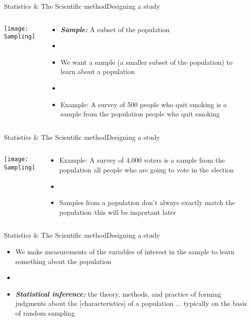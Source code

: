 \documentclass[xcolor=dvipsnames]{beamer}
\begin{document}
\begin{frame}{Statistics \& The Scientific method}{Designing a study}
	\begin{columns}
		\begin{column}{0.5 \textwidth}
			\texttt{[image: Sampling]}
		\end{column}
		\begin{column}{0.5 \textwidth}
			\begin{itemize}
				\item \textbf{\emph{Sample:}} A subset of the population \pause
				\item[]
				\item We want a sample (a smaller subset of the population) to learn about a population \pause
				\item[]
				\item Example: A survey of 500 people who quit smoking is a sample from the population people who quit smoking
			\end{itemize}
		\end{column}
	\end{columns}
\end{frame}

\begin{frame}{Statistics \& The Scientific method}{Designing a study}
	\begin{columns}
		\begin{column}{0.5 \textwidth}
			\texttt{[image: Sampling]}
		\end{column}
		\begin{column}{0.5 \textwidth}
			\begin{itemize}
				\item Example: A survey of 4,000 voters is a sample from the population all people who are going to vote in the election \pause
				\item[]
				\item Samples from a population don't always exactly match the population--this will be important later
			\end{itemize}
		\end{column}
	\end{columns}
\end{frame}

\begin{frame}{Statistics \& The Scientific method}{Designing a study}
	\begin{itemize}
		\item We make measurements of the variables of interest in the sample to learn something about the population \pause
		\item[]
		\item \textbf{\emph{Statistical inference:}} the theory, methods, and practice of forming judgments about the [characteristics] of a population ... typically on the basis of random sampling
	\end{itemize}
\end{frame}
\end{document}
